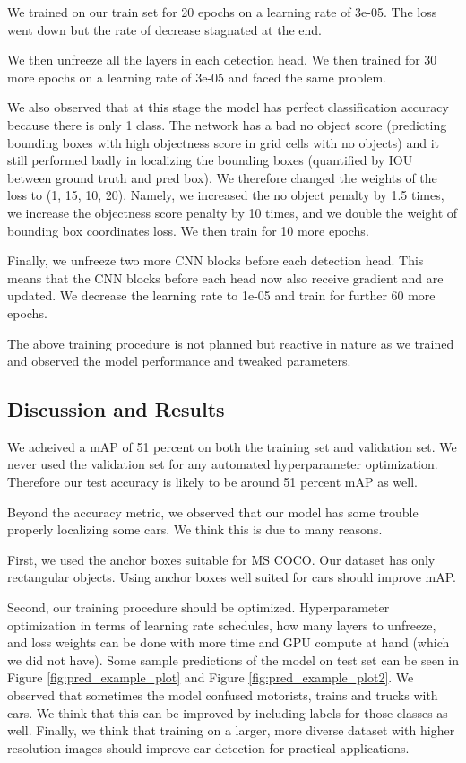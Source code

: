 \documentclass[10pt,twocolumn,letterpaper]{article}
\begin{document}
We trained on our train set for 20 epochs on a learning rate of 3e-05.  The loss went down but the rate of decrease stagnated at the end. 

We then unfreeze all the layers in each detection head. We then trained for 30 more epochs on a learning rate of 3e-05 and faced the same problem. 

We also observed that at this stage the model has perfect classification accuracy because there is only 1 class. The network has a bad no object score (predicting bounding boxes with high objectness score in grid cells with no objects) and it still performed badly in localizing the bounding boxes (quantified by IOU between ground truth and pred box). We therefore changed the weights of the loss to (1, 15, 10, 20). Namely, we increased the no object penalty by 1.5 times, we increase the objectness score penalty by 10 times, and we double the weight of bounding box coordinates loss. We then train for 10 more epochs.

Finally, we unfreeze two more CNN blocks before each detection head. This means that the CNN blocks before each head now also receive gradient and are updated. We decrease the learning rate to 1e-05 and train for further 60 more epochs. 

The above training procedure is not planned but reactive in nature as we trained and observed the model performance and tweaked parameters. 

\subsection{Discussion and Results}
We acheived a mAP of 51 percent on both the training set and validation set. We never used the validation set for any automated hyperparameter optimization. Therefore our test accuracy is likely to be around 51 percent mAP as well. 

Beyond the accuracy metric, we observed that our model has some trouble properly localizing some cars. We think this is due to many reasons.

First, we used the anchor boxes suitable for MS COCO. Our dataset has only rectangular objects. Using anchor boxes well suited for cars should improve mAP. 

Second, our training procedure should be optimized. Hyperparameter optimization in terms of learning rate schedules, how many layers to unfreeze, and loss weights can be done with more time and GPU compute at hand (which we did not have). Some sample predictions of the model on test set can be seen in Figure \ref{fig:pred_example_plot} and Figure \ref{fig:pred_example_plot2}. We observed that sometimes the model confused motorists, trains and trucks with cars. We think that this can be improved by including labels for those classes as well. Finally, we think that training on a larger, more diverse dataset with higher resolution images should improve car detection for practical applications.
\end{document}
